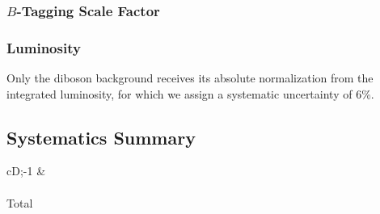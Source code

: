 



\subsubsection[$B$-Tagging Scale Factor]{\boldmath $B$-Tagging Scale Factor\unboldmath}
	


\subsubsection{Luminosity}
Only the diboson background receives its absolute normalization from the integrated luminosity, 
for which we assign a systematic uncertainty of 6\%.

 
\subsection{Systematics Summary}

\begin{table}
  \begin{center}
    \caption{\label{table:signal_systematics_summary} Summary of all systematic
      uncertainties on the signal.}
    \vspace{2mm}

    \small
    \begin{tabular}{cD{;}{\pm}{-1}} 
      \toprule
       & 
       \\
      \midrule
      \\
      \midrule
      Total\\
      \bottomrule
    \end{tabular}
  \end{center}
\end{table}

